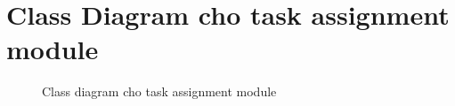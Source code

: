 \section{Class Diagram cho task assignment module}
     \begin{figure}[H]
        \centering
        \caption{Class diagram cho task assignment module}
    \end{figure}


